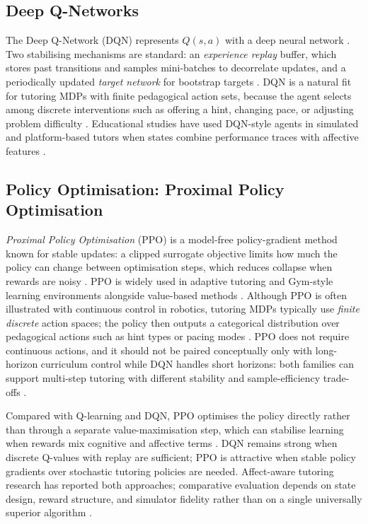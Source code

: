 \subsection{Deep Q-Networks}\label{sec:bg:dqn}

The Deep Q-Network (DQN) represents $Q(s,a)$ with a deep neural network \cite{mnih_dqn_2015}. Two stabilising mechanisms are standard: an \emph{experience replay} buffer, which stores past transitions and samples mini-batches to decorrelate updates, and a periodically updated \emph{target network} for bootstrap targets \cite{mnih_dqn_2015}. DQN is a natural fit for tutoring MDPs with finite pedagogical action sets, because the agent selects among discrete interventions such as offering a hint, changing pace, or adjusting problem difficulty \cite{axak_adaptive_nodate,kong_real-time_2025,gong_design_2025,perez_emotions_2024,deshmukh_developing_2025}. Educational studies have used DQN-style agents in simulated and platform-based tutors when states combine performance traces with affective features \cite{govea_implementation_2024,sayed_ai-based_2023}.

\subsection{Policy Optimisation: Proximal Policy Optimisation}\label{sec:bg:ppo}

\emph{Proximal Policy Optimisation} (PPO) is a model-free policy-gradient method known for stable updates: a clipped surrogate objective limits how much the policy can change between optimisation steps, which reduces collapse when rewards are noisy \cite{guzman_developing_2025,axak_adaptive_nodate}. PPO is widely used in adaptive tutoring and Gym-style learning environments alongside value-based methods \cite{guzman_developing_2025,govea_implementation_2024,axak_adaptive_nodate}. Although PPO is often illustrated with continuous control in robotics, tutoring MDPs typically use \emph{finite discrete} action spaces; the policy then outputs a categorical distribution over pedagogical actions such as hint types or pacing modes \cite{guzman_developing_2025,deshmukh_developing_2025}. PPO does not require continuous actions, and it should not be paired conceptually only with long-horizon curriculum control while DQN handles short horizons: both families can support multi-step tutoring with different stability and sample-efficiency trade-offs \cite{sutton_rl_book_2018,guzman_developing_2025}.

Compared with Q-learning and DQN, PPO optimises the policy directly rather than through a separate value-maximisation step, which can stabilise learning when rewards mix cognitive and affective terms \cite{guzman_developing_2025,perez_emotions_2024}. DQN remains strong when discrete Q-values with replay are sufficient; PPO is attractive when stable policy gradients over stochastic tutoring policies are needed. Affect-aware tutoring research has reported both approaches; comparative evaluation depends on state design, reward structure, and simulator fidelity rather than on a single universally superior algorithm \cite{govea_implementation_2024,axak_adaptive_nodate,guzman_developing_2025,deshmukh_developing_2025}.

